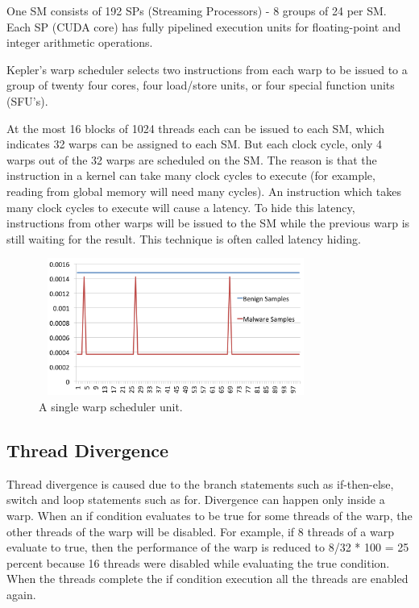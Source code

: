 One SM consists of 192 SPs (Streaming Processors) - 8 groups of 24 per SM. Each SP (CUDA core) has fully pipelined execution units for floating-point and integer arithmetic operations.

Kepler’s warp scheduler selects two instructions from each warp to be issued to a group of  twenty four cores, four load/store units, or four special function units (SFU’s).

At the most 16 blocks of 1024 threads each can be issued to each SM, which indicates 32 warps can be assigned to each SM. But each clock cycle, only 4 warps out of the 32 warps are scheduled on the SM. The reason is that the instruction in a kernel can take many clock cycles to execute (for example, reading from global memory will need many cycles). An instruction which takes many clock cycles to execute will cause a latency. To hide this latency, instructions from other warps will be issued to the SM while the previous warp is still waiting for the result. This technique is often called latency hiding.

\begin{figure}
	\centering
	\includegraphics[width=9cm, height=4.5cm]{500.png}
	\caption{A single warp scheduler unit\cite{bib1}.}
	\label{fig:warpscheduler}
\end{figure}

\subsection{Thread Divergence}
Thread divergence is caused due to the branch statements such as if-then-else, switch and loop statements such as for. Divergence can happen only inside a warp. When an if condition evaluates to be true for some threads of the warp, the other threads of  the warp will be disabled. For example, if 8 threads of a warp evaluate to true, then the performance of the warp is reduced to 8/32 * 100 = 25 percent because 16 threads were disabled while evaluating the true condition.
When the threads complete the if condition execution all the threads are enabled again. 

